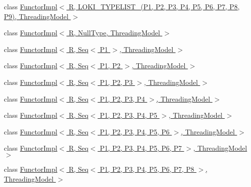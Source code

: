 \begin{DoxyCompactItemize}
\item 
class \hyperlink{classLoki_1_1FunctorImpl_3_01R_00_01LOKI__TYPELIST__9_07P1_00_01P2_00_01P3_00_01P4_00_01P5_00_01493beb80705da8521e05ba7a51e552dd}{Functor\+Impl$<$ R, L\+O\+K\+I\+\_\+\+T\+Y\+P\+E\+L\+I\+S\+T\+\_(\+P1, P2, P3, P4, P5, P6, P7, P8, P9),                                                                           Threading\+Model $>$}
\item 
class \hyperlink{classLoki_1_1FunctorImpl_3_01R_00_01NullType_00_01ThreadingModel_01_4}{Functor\+Impl$<$ R, Null\+Type, Threading\+Model $>$}
\item 
class \hyperlink{classLoki_1_1FunctorImpl_3_01R_00_01Seq_3_01P1_01_4_00_01ThreadingModel_01_4}{Functor\+Impl$<$ R, Seq$<$ P1 $>$, Threading\+Model $>$}
\item 
class \hyperlink{classLoki_1_1FunctorImpl_3_01R_00_01Seq_3_01P1_00_01P2_01_4_00_01ThreadingModel_01_4}{Functor\+Impl$<$ R, Seq$<$ P1, P2 $>$, Threading\+Model $>$}
\item 
class \hyperlink{classLoki_1_1FunctorImpl_3_01R_00_01Seq_3_01P1_00_01P2_00_01P3_01_4_00_01ThreadingModel_01_4}{Functor\+Impl$<$ R, Seq$<$ P1, P2, P3 $>$, Threading\+Model $>$}
\item 
class \hyperlink{classLoki_1_1FunctorImpl_3_01R_00_01Seq_3_01P1_00_01P2_00_01P3_00_01P4_01_4_00_01ThreadingModel_01_4}{Functor\+Impl$<$ R, Seq$<$ P1, P2, P3, P4 $>$, Threading\+Model $>$}
\item 
class \hyperlink{classLoki_1_1FunctorImpl_3_01R_00_01Seq_3_01P1_00_01P2_00_01P3_00_01P4_00_01P5_01_4_00_01ThreadingModel_01_4}{Functor\+Impl$<$ R, Seq$<$ P1, P2, P3, P4, P5 $>$, Threading\+Model $>$}
\item 
class \hyperlink{classLoki_1_1FunctorImpl_3_01R_00_01Seq_3_01P1_00_01P2_00_01P3_00_01P4_00_01P5_00_01P6_01_4_00_01ThreadingModel_01_4}{Functor\+Impl$<$ R, Seq$<$ P1, P2, P3, P4, P5, P6 $>$, Threading\+Model $>$}
\item 
class \hyperlink{classLoki_1_1FunctorImpl_3_01R_00_01Seq_3_01P1_00_01P2_00_01P3_00_01P4_00_01P5_00_01P6_00_01P7_01_4_00_01ThreadingModel_01_4}{Functor\+Impl$<$ R, Seq$<$ P1, P2, P3, P4, P5, P6, P7 $>$, Threading\+Model $>$}
\item 
class \hyperlink{classLoki_1_1FunctorImpl_3_01R_00_01Seq_3_01P1_00_01P2_00_01P3_00_01P4_00_01P5_00_01P6_00_01P7_06c19e0651c71b6e2b0b1938538813ae6}{Functor\+Impl$<$ R, Seq$<$ P1, P2, P3, P4, P5, P6, P7, P8 $>$,                                                                           Threading\+Model $>$}
\item 

\end{DoxyCompactItemize}
